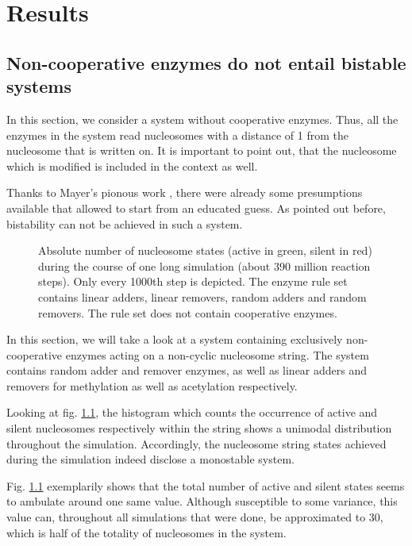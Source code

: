 \chapter{Results}
    \label{cha:results}
    \section{Non-cooperative enzymes do not entail bistable systems}
        \label{sec:ResNon-cooperative}
        In this section, we consider a system without cooperative enzymes. Thus, all the enzymes in the system read nucleosomes with a distance of 1 from the nucleosome that is written on. It is important to point out, that the nucleosome which is modified is included in the context as well.

        Thanks to Mayer's pionous work \cite{mayer2020langevin}, there were already some presumptions available that allowed to start from an educated guess. As pointed out before, bistability can not be achieved in such a system.\\
        \begin{figure}[!htbp]
            \centering
            \caption{Absolute number of nucleosome states (active in green, silent in red) during the course of one long simulation (about 390 million reaction steps). Only every 1000th step is depicted. The enzyme rule set contains linear adders, linear removers, random adders and random removers. The rule set does not contain cooperative enzymes.}
            \label{img:nonCoopSim}
        \end{figure}

        In this section, we will take a look at a system containing exclusively non-cooperative enzymes acting on a non-cyclic nucleosome string. The system contains random adder and remover enzymes, as well as linear adders and removers for methylation as well as acetylation respectively.

        Looking at fig. \ref{img:nonCoopSim}, the histogram which counts the occurrence of active and silent nucleosomes respectively within the string shows a unimodal distribution throughout the simulation. Accordingly, the nucleosome string states achieved during the simulation indeed disclose a monostable system.

        Fig. \ref{img:nonCoopSim} exemplarily shows that the total number of active and silent states seems to ambulate around one same value. Although susceptible to some variance, this value can, throughout all simulations that were done, be approximated to 30, which is half of the totality of nucleosomes in the system.

